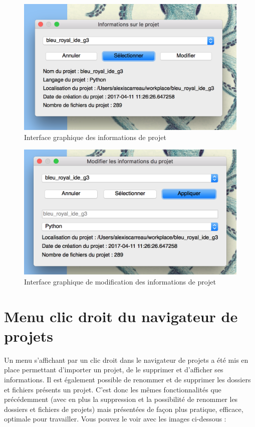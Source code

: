 \documentclass[a4paper,12pt]{article}
\begin{document}
\begin{figure}[h!]
			\begin{center}
				\includegraphics[scale=0.5]{images/info_project2.png}
				\caption{Interface graphique des informations de projet}
			\end{center}
		\end{figure}
		
\begin{figure}[h!]
			\begin{center}
				\includegraphics[scale=0.5]{images/info_project3.png}
				\caption{Interface graphique de modification des informations de projet}
			\end{center}
		\end{figure}

\section{Menu clic droit du navigateur de projets}

Un menu s'affichant par un clic droit dans le navigateur de projets a été mis en place permettant d'importer un projet, de le supprimer et d'afficher ses informations. Il est également possible de renommer et de supprimer les dossiers et fichiers présents un projet. C'est donc les mêmes fonctionnalités que précédemment (avec en plus la suppression et la possibilité de renommer les dossiers et fichiers de projets) mais présentées de façon plus pratique, efficace, optimale pour travailler. Vous pouvez le voir avec les images ci-dessous :
\end{document}
